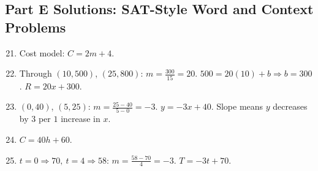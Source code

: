 \documentclass[14pt]{extarticle}
\begin{document}
\subsection*{Part E Solutions: SAT-Style Word and Context Problems}
\begin{enumerate}
    \setcounter{enumi}{20}
    \item Cost model: \(\boxed{C=2m+4}\).
    \item Through \((10,500)\), \((25,800)\): \(m=\frac{300}{15}=20\). \(500=20(10)+b\Rightarrow b=300\). \(\boxed{R=20x+300}\).
    \item \((0,40)\), \((5,25)\): \(m=\frac{25-40}{5-0}=-3\). \(\boxed{y=-3x+40}\). Slope means \(y\) decreases by \(3\) per \(1\) increase in \(x\).
    \item \(\boxed{C=40h+60}\).
    \item \(t=0\Rightarrow 70,\ t=4\Rightarrow58\): \(m=\frac{58-70}{4}=-3\). \(\boxed{T=-3t+70}\).
\end{enumerate}
\end{document}
